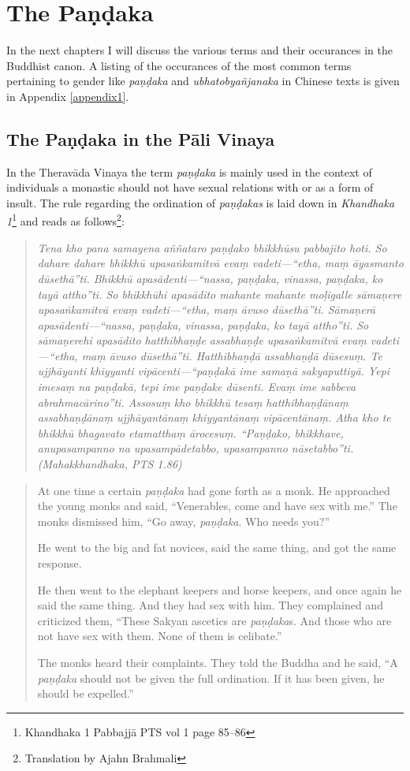 \section{The Paṇḍaka}

In the next chapters I will discuss the various terms and their occurances in the Buddhist canon. A listing of the occurances of the most common terms pertaining to gender like {\em paṇḍaka} and {\em ubhatob­yañ­janaka} in Chinese texts is given in Appendix \ref{appendix1}. 

\subsection{The Paṇḍaka in the Pāli Vinaya}
In the Theravāda Vinaya the term {\em paṇḍaka} is mainly used in the context of individuals a monastic should not have sexual relations with or as a form of insult. The rule regarding the ordination of {\em paṇḍakas} is laid down in {\em Khandhaka 1}\footnote{Khandhaka 1 Pabbajjā PTS vol 1 page 85–86} and reads as follows\footnote{Translation by Ajahn Brahmali}:

\begin{quote}
{\em Tena kho pana samayena aññataro paṇḍako bhikkhūsu pabbajito hoti. So dahare dahare bhikkhū upasaṅkamitvā evaṃ vadeti—“etha, maṃ āyasmanto dūsethā”ti. Bhikkhū apasādenti—“nassa, paṇḍaka, vinassa, paṇḍaka, ko tayā attho”ti. So bhikkhūhi apasādito mahante mahante moḷigalle sāmaṇere upasaṅkamitvā evaṃ vadeti—“etha, maṃ āvuso dūsethā”ti. Sāmaṇerā apasādenti—“nassa, paṇḍaka, vinassa, paṇḍaka, ko tayā attho”ti. So sāmaṇerehi apasādito hatthibhaṇḍe assabhaṇḍe upasaṅkamitvā evaṃ vadeti—“etha, maṃ āvuso dūsethā”ti. Hatthibhaṇḍā assabhaṇḍā dūsesuṃ. Te ujjhāyanti khiyyanti vipācenti—“paṇḍakā ime samaṇā sakyaputtiyā. Yepi imesaṃ na paṇḍakā, tepi ime paṇḍake dūsenti. Evaṃ ime sabbeva abrahmacārino”ti. Assosuṃ kho bhikkhū tesaṃ hatthibhaṇḍānaṃ assabhaṇḍānaṃ ujjhāyantānaṃ khiyyantānaṃ vipācentānaṃ. Atha kho te bhikkhū bhagavato etamatthaṃ ārocesuṃ. “Paṇḍako, bhikkhave, anupasampanno na upasampādetabbo, upasampanno nāsetabbo”ti. (Mahakkhandhaka, PTS 1.86)}
\end{quote}

\begin{quote}
At one time a certain {\em paṇḍaka} had gone forth as a monk. He approached the young monks and said, “Venerables, come and have sex with me.” The monks dismissed him, “Go away, {\em paṇḍaka}. Who needs you?”

He went to the big and fat novices, said the same thing, and got the same response.

He then went to the elephant keepers and horse keepers, and once again he said the same thing. And they had sex with him. They complained and criticized them, “These Sakyan ascetics are {\em paṇḍaka}s. And those who are not have sex with them. None of them is celibate.”

The monks heard their complaints. They told the Buddha and he said, “A {\em paṇḍaka} should not be given the full ordination. If it has been given, he should be expelled.”
\end{quote}

